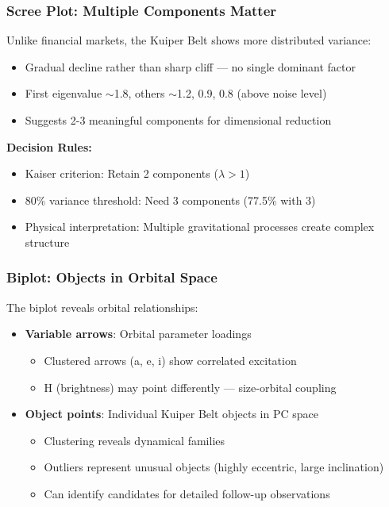\documentclass[aspectratio=169]{beamer}
\begin{document}
\begin{frame}
    \frametitle{Scree Plot: Multiple Components Matter}
    Unlike financial markets, the Kuiper Belt shows more distributed variance:
    \begin{itemize}
        \item Gradual decline rather than sharp cliff — no single dominant factor \pause
        \item First eigenvalue $\sim$1.8, others $\sim$1.2, 0.9, 0.8 (above noise level) \pause
        \item Suggests 2-3 meaningful components for dimensional reduction \pause
    \end{itemize}
    \vspace{12pt}
    \textbf{Decision Rules:}
    \begin{itemize}
        \item Kaiser criterion: Retain 2 components ($\lambda > 1$) \pause
        \item 80\% variance threshold: Need 3 components (77.5\% with 3) \pause
        \item Physical interpretation: Multiple gravitational processes create complex structure \pause
    \end{itemize}
\end{frame}

\begin{frame}
    \frametitle{Biplot: Objects in Orbital Space}
    The biplot reveals orbital relationships:
    \begin{itemize}
        \item \textbf{Variable arrows}: Orbital parameter loadings \pause
              \begin{itemize}
                  \item Clustered arrows (a, e, i) show correlated excitation \pause
                  \item H (brightness) may point differently — size-orbital coupling \pause
              \end{itemize}
        \item \textbf{Object points}: Individual Kuiper Belt objects in PC space \pause
              \begin{itemize}
                  \item Clustering reveals dynamical families \pause
                  \item Outliers represent unusual objects (highly eccentric, large inclination) \pause
                  \item Can identify candidates for detailed follow-up observations \pause
              \end{itemize}
    \end{itemize}
\end{frame}
\end{document}
